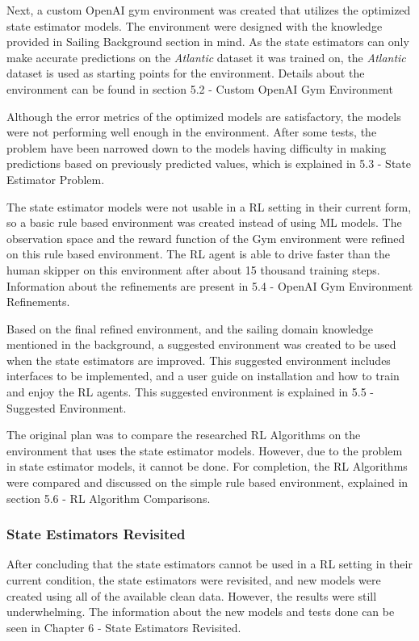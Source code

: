 \documentclass[12pt,twoside]{report}
\begin{document}
Next, a custom OpenAI gym environment was created that utilizes the optimized state estimator models. The environment were designed with the knowledge provided in Sailing Background section in mind. As the state estimators can only make accurate predictions on the \textit{Atlantic} dataset it was trained on, the \textit{Atlantic} dataset is used as starting points for the environment. Details about the environment can be found in section 5.2 - Custom OpenAI Gym Environment

Although the error metrics of the optimized models are satisfactory, the models were not performing well enough in the environment. After some tests, the problem have been narrowed down to the models having difficulty in making predictions based on previously predicted values, which is explained in 5.3 - State Estimator Problem.

The state estimator models were not usable in a RL setting in their current form, so a basic rule based environment was created instead of using ML models. The observation space and the reward function of the Gym environment were refined on this rule based environment. The RL agent is able to drive faster than the human skipper on this environment after about 15 thousand training steps. Information about the refinements are present in 5.4 - OpenAI Gym Environment Refinements.

Based on the final refined environment, and the sailing domain knowledge mentioned in the background, a suggested environment was created to be used when the state estimators are improved. This suggested environment includes interfaces to be implemented, and a user guide on installation and how to train and enjoy the RL agents. This suggested environment is explained in 5.5 - Suggested Environment.

The original plan was to compare the researched RL Algorithms on the environment that uses the state estimator models. However, due to the problem in state estimator models, it cannot be done. For completion, the RL Algorithms were compared and discussed on the simple rule based environment, explained in section 5.6 - RL Algorithm Comparisons.

\subsubsection{State Estimators Revisited}
After concluding that the state estimators cannot be used in a RL setting in their current condition, the state estimators were revisited, and new models were created using all of the available clean data. However, the results were still underwhelming. The information about the new models and tests done can be seen in Chapter 6 - State Estimators Revisited. 
\end{document}
